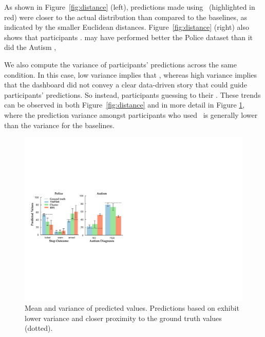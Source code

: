 As shown in Figure~\ref{fig:distance} (left),
predictions made using \system\ (highlighted in red)
were closer to the actual distribution than compared to the baselines,
as indicated by the smaller Euclidean distances.
Figure~\ref{fig:distance} (right) also shows
that \system participants .
\cluster may have performed better 
the Police dataset than it did 
the Autism ,


\par We also compute the variance of participants' predictions across the same condition. In this case, low variance implies
that ,
whereas high variance implies that the
dashboard did not convey a clear data-driven story
that could guide participants' predictions.
So instead, participants  guessing to
 their . These trends can be observed in both Figure~\ref{fig:distance} and in more detail in Figure \ref{fig:actual_predictions}, where the prediction variance amongst participants who used \system\ is generally lower than the variance for the baselines. 
\begin{figure}[h!]
\vspace{-10pt}
\centering
\includegraphics[width=0.85\linewidth]{figures/prediction.pdf}
\vspace{-10pt}
\caption{Mean and variance of predicted values. Predictions based on \system exhibit lower variance  and closer proximity to the ground truth values (dotted).}%
\label{fig:actual_predictions}
\vspace{-10pt}
\end{figure}
